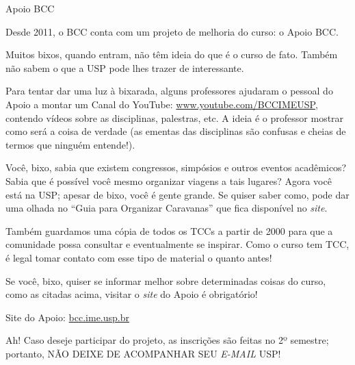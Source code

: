 \begin{subsubsecao}{Apoio BCC}

Desde 2011, o BCC conta com um projeto de melhoria do curso: o Apoio BCC.

Muitos bixos, quando entram, não têm ideia do que é o curso de fato. Também não 
sabem o que a USP pode lhes trazer de interessante.

Para tentar dar uma luz à bixarada, alguns professores ajudaram o pessoal do
Apoio a montar um Canal do YouTube: \url{www.youtube.com/BCCIMEUSP}, contendo vídeos sobre as disciplinas, palestras, etc. A ideia é o professor mostrar como será 
a coisa de verdade (as ementas das disciplinas são confusas e cheias de termos 
que ninguém entende!).

Você, bixo, sabia que existem congressos, simpósios e outros eventos acadêmicos? 
Sabia que é possível você mesmo organizar viagens a tais lugares? Agora você 
está na USP; apesar de bixo, você é gente grande. Se quiser saber como, pode dar uma 
olhada no ``Guia para Organizar Caravanas'' que fica disponível no \textit{site}.

Também guardamos uma cópia de todos os TCCs a partir de 2000 para que a 
comunidade possa consultar e eventualmente se inspirar. Como o curso tem TCC, é 
legal tomar contato com esse tipo de material o quanto antes!

Se você, bixo, quiser se informar melhor sobre determinadas coisas do curso, 
como as citadas acima, visitar o \textit{site} do Apoio é obrigatório!

Site do Apoio: \url{bcc.ime.usp.br}

Ah! Caso deseje participar do projeto, as inscrições são feitas no 2º 
semestre; portanto, NÃO DEIXE DE ACOMPANHAR SEU \textit{E-MAIL} USP!

\end{subsubsecao}
